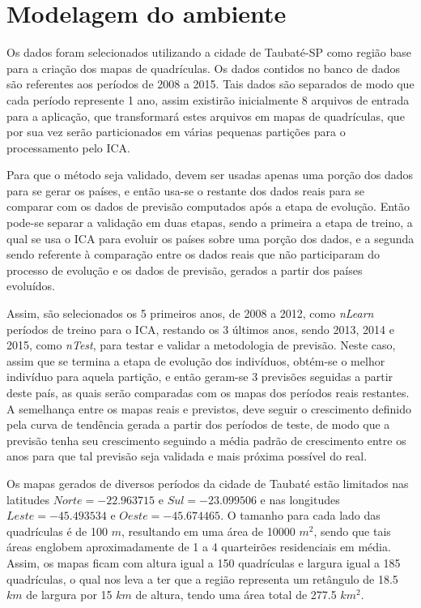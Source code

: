 \section{Modelagem do ambiente}
\label{Exp:Modelagem do ambiente}

Os dados foram selecionados utilizando a cidade de Taubaté-SP como região base para a criação dos mapas de quadrículas. Os dados contidos no banco de dados são referentes aos períodos de 2008 a 2015. Tais dados são separados de modo que cada período represente 1 ano, assim existirão inicialmente 8 arquivos de entrada para a aplicação, que transformará estes arquivos em mapas de quadrículas, que por sua vez serão particionados em várias pequenas partições para o processamento pelo ICA. 

Para que o método seja validado, devem ser usadas apenas uma porção dos dados para se gerar os países, e então usa-se o restante dos dados reais para se comparar com os dados de previsão computados após a etapa de evolução. Então pode-se separar a validação em duas etapas, sendo a primeira a etapa de treino, a qual se usa o ICA para evoluir os países sobre uma porção dos dados, e a segunda sendo referente à comparação entre os dados reais que não participaram do processo de evolução e os dados de previsão, gerados a partir dos países evoluídos. 

Assim, são selecionados os 5 primeiros anos, de 2008 a 2012, como \emph{nLearn} períodos de treino para o ICA, restando os 3 últimos anos, sendo 2013, 2014 e 2015, como \emph{nTest}, para testar e validar a metodologia de previsão. Neste caso, assim que se termina a etapa de evolução dos indivíduos, obtém-se o melhor indivíduo para aquela partição, e então geram-se 3 previsões seguidas a partir deste país, as quais serão comparadas com os mapas dos períodos reais restantes. A semelhança entre os mapas reais e previstos, deve seguir o crescimento definido pela curva de tendência gerada a partir dos períodos de teste, de modo que a previsão tenha seu crescimento seguindo a média padrão de crescimento entre os anos para que tal previsão seja validada e mais próxima possível do real.

Os mapas gerados de diversos períodos da cidade de Taubaté estão limitados nas latitudes \(Norte = -22.963715\) e \(Sul = -23.099506\) e nas longitudes \(Leste = -45.493534\) e \(Oeste = -45.674465\). O tamanho para cada lado das quadrículas é de 100 \(m\), resultando em uma área de 10000 \(m^2\), sendo que tais áreas englobem aproximadamente de 1 a 4 quarteirões residenciais em média. Assim, os mapas ficam com altura igual a 150 quadrículas e largura igual a 185 quadrículas, o qual nos leva a ter que a região representa um retângulo de 18.5 \(km\) de largura por 15 \(km\) de altura, tendo uma área total de 277.5 \(km^2\). 

